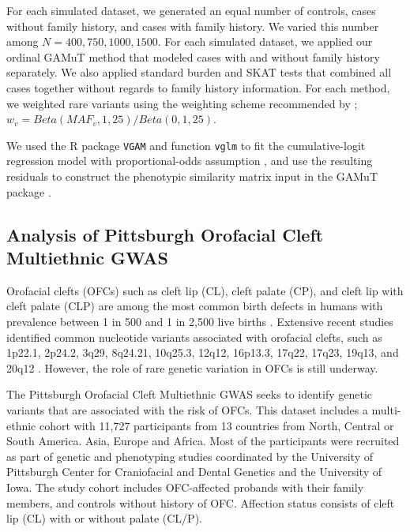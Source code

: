 \documentclass[]{article}
\begin{document}
For each simulated dataset, we generated an equal number of controls, cases without family history, and cases with family history. We varied this number among \(N=400, 750, 1000, 1500\).
For each simulated dataset, we applied our ordinal GAMuT method that modeled cases with and without family history separately. We also applied standard burden and SKAT tests that combined all cases together without regards to family history information. For each method, we weighted rare variants using the weighting scheme recommended by \citet{Wu2011}; \(w_v=Beta(MAF_v,1,25)/Beta(0,1,25)\).

We used the R package \texttt{VGAM} and function \texttt{vglm} to fit the
cumulative-logit regression model with proportional-odds assumption \citep{Yee2010}, and use the resulting residuals to construct the phenotypic similarity matrix input in the GAMuT package \citep{Broadaway2016}.

\hypertarget{analysis-of-pittsburgh-orofacial-cleft-multiethnic-gwas}{%
\subsection{Analysis of Pittsburgh Orofacial Cleft Multiethnic GWAS}\label{analysis-of-pittsburgh-orofacial-cleft-multiethnic-gwas}}

Orofacial clefts (OFCs) such as cleft lip (CL), cleft palate (CP), and cleft lip with cleft palate (CLP)
are among the most common birth defects in humans with prevalence between 1 in 500 and
1 in 2,500 live births \citep{Tessier1976, Mossey2009}. Extensive recent studies
identified common nucleotide variants associated with orofacial clefts, such as 1p22.1, 2p24.2, 3q29, 8q24.21, 10q25.3, 12q12, 16p13.3, 17q22, 17q23, 19q13, and 20q12 \citep{Birnbaum2009, Grant2009, Beaty2010, Mangold2009, Wolf2015, Leslie2016, Leslie2016b, Mostowska2018}.
However, the role of rare genetic variation in OFCs is still underway.

The Pittsburgh Orofacial Cleft Multiethnic GWAS \citep{Leslie2016, Leslie2016b} seeks to identify genetic variants that are associated with the risk of OFCs. This dataset includes a multi-ethnic cohort with 11,727 participants from 13 countries from North, Central or South America. Asia, Europe and Africa. Most of the participants were recruited as part of genetic and phenotyping studies coordinated by the University of Pittsburgh Center for Craniofacial and Dental Genetics and the University of Iowa. The study cohort includes OFC-affected probands with their family members, and controls without history of OFC. Affection status consists of cleft lip (CL) with or without palate (CL/P).
\end{document}
